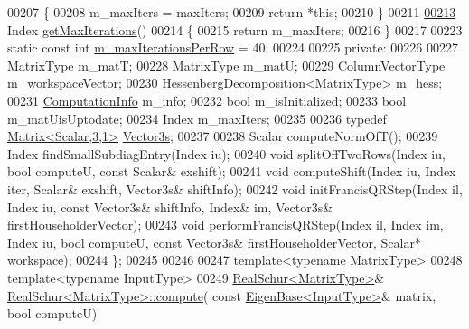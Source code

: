 \begin{DoxyCode}
00207     \{
00208       m\_maxIters = maxIters;
00209       \textcolor{keywordflow}{return} *\textcolor{keyword}{this};
00210     \}
00211 
\hyperlink{group___eigenvalues___module_a99453076a9617a6af353b5b1f3220c25}{00213}     Index \hyperlink{group___eigenvalues___module_a99453076a9617a6af353b5b1f3220c25}{getMaxIterations}()
00214     \{
00215       \textcolor{keywordflow}{return} m\_maxIters;
00216     \}
00217 
00223     \textcolor{keyword}{static} \textcolor{keyword}{const} \textcolor{keywordtype}{int} \hyperlink{group___eigenvalues___module_ab42163ff22cd3ad98aa2bde39b4bbc79}{m\_maxIterationsPerRow} = 40;
00224 
00225   \textcolor{keyword}{private}:
00226     
00227     MatrixType m\_matT;
00228     MatrixType m\_matU;
00229     ColumnVectorType m\_workspaceVector;
00230     \hyperlink{group___eigenvalues___module}{HessenbergDecomposition<MatrixType>} m\_hess;
00231     \hyperlink{group__enums_ga85fad7b87587764e5cf6b513a9e0ee5e}{ComputationInfo} m\_info;
00232     \textcolor{keywordtype}{bool} m\_isInitialized;
00233     \textcolor{keywordtype}{bool} m\_matUisUptodate;
00234     Index m\_maxIters;
00235 
00236     \textcolor{keyword}{typedef} \hyperlink{group___core___module}{Matrix<Scalar,3,1>} \hyperlink{group___core___module}{Vector3s};
00237 
00238     Scalar computeNormOfT();
00239     Index findSmallSubdiagEntry(Index iu);
00240     \textcolor{keywordtype}{void} splitOffTwoRows(Index iu, \textcolor{keywordtype}{bool} computeU, \textcolor{keyword}{const} Scalar& exshift);
00241     \textcolor{keywordtype}{void} computeShift(Index iu, Index iter, Scalar& exshift, Vector3s& shiftInfo);
00242     \textcolor{keywordtype}{void} initFrancisQRStep(Index il, Index iu, \textcolor{keyword}{const} Vector3s& shiftInfo, Index& im, Vector3s& 
      firstHouseholderVector);
00243     \textcolor{keywordtype}{void} performFrancisQRStep(Index il, Index im, Index iu, \textcolor{keywordtype}{bool} computeU, \textcolor{keyword}{const} Vector3s& 
      firstHouseholderVector, Scalar* workspace);
00244 \};
00245 
00246 
00247 \textcolor{keyword}{template}<\textcolor{keyword}{typename} MatrixType>
00248 \textcolor{keyword}{template}<\textcolor{keyword}{typename} InputType>
00249 \hyperlink{group___eigenvalues___module}{RealSchur<MatrixType>}& \hyperlink{group___eigenvalues___module_a60caf9ffad11d728ea458c4dd36d0a98}{RealSchur<MatrixType>::compute}(\textcolor{keyword}{
      const} \hyperlink{group___core___module_struct_eigen_1_1_eigen_base}{EigenBase<InputType>}& matrix, \textcolor{keywordtype}{bool} computeU)

\end{DoxyCode}
